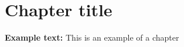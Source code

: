 \documentclass[../main.tex]{subfiles}
\begin{document}
    \section{Chapter title}
    \textbf{Example text:}
    This is an example of a chapter
    \pagebreak
\end{document}
